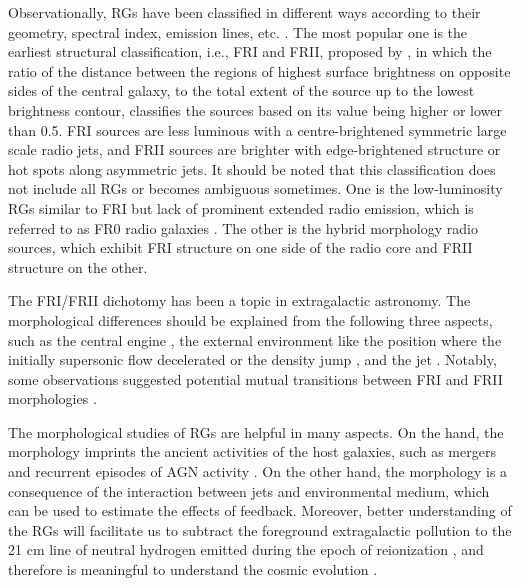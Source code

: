 \documentclass{aa}
\begin{document}
Observationally, RGs have been classified in different ways according to their geometry, spectral index, emission lines, etc. \citep[e.g.,][]{fanaroff_morphology_1974,osterbrock_broad_1975,heckman_optical_1980,veilleux_spectral_1987,owen_ccd_1989}. 
The most popular one is the earliest structural classification, i.e., FRI and FRII, proposed by \citet{fanaroff_morphology_1974}, in which the ratio of the distance between the regions of highest surface brightness on opposite sides of the central galaxy, to the total extent of the source up to the lowest brightness contour, classifies the sources based on its value being higher or lower than 0.5. FRI sources are less luminous with a centre-brightened symmetric large scale radio jets, and FRII sources are brighter with edge-brightened structure or hot spots along asymmetric jets. 
It should be noted that this classification does not include all RGs or becomes ambiguous sometimes.
One is the low-luminosity RGs similar to FRI but lack of prominent extended radio emission, which is referred to as FR0 radio galaxies \citep[e.g.,][]{baldi_pilot_2015,baldi_fr0cat_2018}.
The other is the hybrid morphology radio sources, which exhibit FRI structure on one side of the radio core and FRII structure on the other\cite[e.g.,][]{mingo_revisiting_2019,gopal-krishna_extragalactic_2000,manik_hybrid_2025}.


The FRI/FRII dichotomy has been a topic in extragalactic astronomy.
The morphological differences should be explained from the following three aspects, 
such as the central engine \citep[e.g.,][]{Baum1995,Meier1999,hardcastle_radio_2020},
the external environment like the position where the initially supersonic flow decelerated or the density jump \citep[e.g.,][]{de_young_relation_1993,bicknell_relativistic_1995,bowman_deceleration_1996,liu_environment_2019},
and the jet \citep[e.g.,][]{florido_spatial_1990,Reynolds1996,Meier1997,lane_3c_2002}.
Notably, some observations suggested potential mutual transitions between FRI and FRII morphologies \citep{foschi_evolution_2025,wang_entrainment-limited_2011}.  


The morphological studies of RGs are helpful in many aspects. 
On the hand, the morphology imprints the ancient activities of the host galaxies, such as mergers and recurrent episodes of AGN activity \citep[e.g.,][]{merritt_tracing_2002,liu_x-shaped_2004,hardcastle_ngc_2019,lara_restarting_1999,saikia_recurrent_2009,kuzmicz_optical_2017}. 
On the other hand, the morphology is a consequence of the interaction between jets and environmental medium, which can be used to estimate the effects of feedback\citep{begelman_theory_1984,blandford_relativistic_2019}.
Moreover, better understanding of the RGs will facilitate us to subtract the foreground extragalactic pollution to the 21 cm line of neutral hydrogen emitted during the epoch of reionization \citep{di_matteo_radio_2002,di_matteo_21-cm_2004}, and therefore is meaningful to understand the cosmic evolution \citep{madau_21_1997,tozzi_radio_2000,furlanetto_cosmology_2006}.
\end{document}
